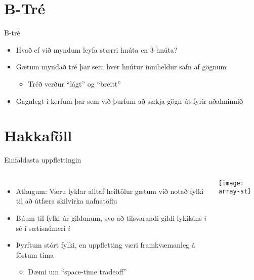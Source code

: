 \documentclass{beamer}
\begin{document}
\section{B-Tré}

\begin{frame}{B-tré}
	\begin{itemize}
		\item Hvað ef við myndum leyfa stærri hnúta en 3-hnúta?
		\item Gætum myndað tré þar sem hver hnútur inniheldur safn af gögnum
		      \begin{itemize}
			      \item Tréð verður ``lágt'' og ``breitt''
		      \end{itemize}
		\item Gagnlegt í kerfum þar sem við þurfum að sækja gögn út fyrir aðalminnið
	\end{itemize}
\end{frame}






\section{Hakkaföll}

\begin{frame}{Einfaldasta uppflettingin}
	\begin{columns}
		\begin{itemize}
			\item Athugum: Væru lyklar alltaf heiltölur gætum við notað fylki til að útfæra skilvirka nafnatöflu
			\item Búum til fylki úr gildunum, svo að tilsvarandi gildi lykilsins $i$ sé í sætisnúmeri $i$
			\item Þyrftum stórt fylki, en uppfletting væri framkvæmanleg á föstum tíma
			      \begin{itemize}
				      \item Dæmi um ``space-time tradeoff''
			      \end{itemize}
		\end{itemize}
		\texttt{[image: array-st]}
	\end{columns}
\end{frame}
\end{document}
